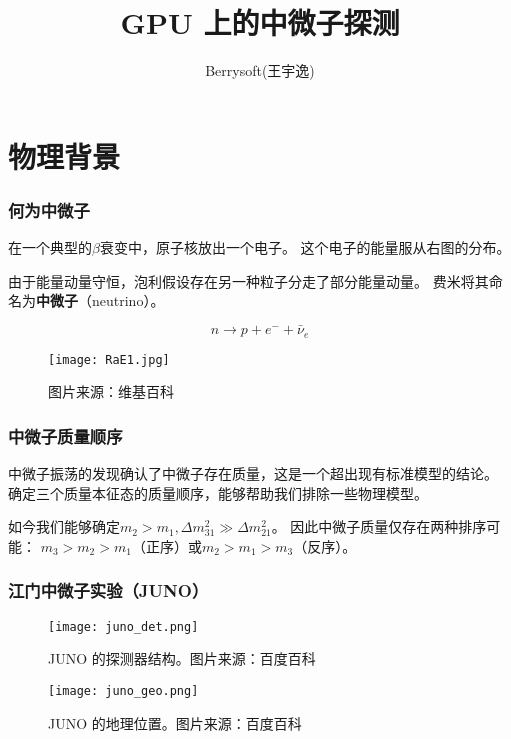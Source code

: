 \documentclass[aspectratio=149]{beamer}
\title{GPU 上的中微子探测}
\author{Berrysoft(王宇逸)}
\begin{document}
\begin{frame}
    \titlepage
\end{frame}
\section{物理背景}
\begin{frame}
    \frametitle{何为中微子}

    \begin{multicols}{2}
        在一个典型的$\beta$衰变中，原子核放出一个电子。
        这个电子的能量服从右图的分布。

        由于能量动量守恒，泡利假设存在另一种粒子分走了部分能量动量。
        费米将其命名为\textbf{中微子}（neutrino）。

        \begin{equation*}
            n\to p+e^-+\bar{\nu}_e
        \end{equation*}
        \columnbreak
        \begin{figure}
            \centering
            \texttt{[image: RaE1.jpg]}
            \caption{图片来源：维基百科}
        \end{figure}
    \end{multicols}

\end{frame}

\begin{frame}
    \frametitle{中微子质量顺序}

    中微子振荡的发现确认了中微子存在质量，这是一个超出现有标准模型的结论。
    确定三个质量本征态的质量顺序，能够帮助我们排除一些物理模型。

    如今我们能够确定$m_2>m_1,\Delta m_{31}^2 \gg \Delta m_{21}^2$。
    因此中微子质量仅存在两种排序可能：
    $m_3>m_2>m_1$（正序）或$m_2>m_1>m_3$（反序）。

\end{frame}

\begin{frame}[allowframebreaks]
    \frametitle{江门中微子实验（JUNO）}

    \begin{figure}
        \centering
        \texttt{[image: juno\_det.png]}
        \caption{JUNO 的探测器结构。图片来源：百度百科}
    \end{figure}

    \begin{figure}
        \centering
        \texttt{[image: juno\_geo.png]}
        \caption{JUNO 的地理位置。图片来源：百度百科}
    \end{figure}

\end{frame}
\end{document}

